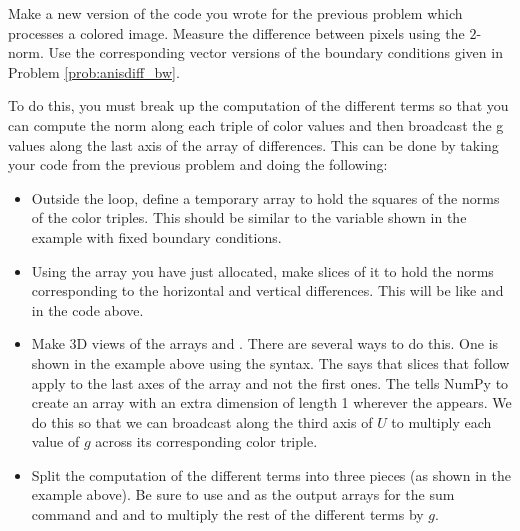 \begin{problem}
Make a new version of the code you wrote for the previous problem which processes a colored image.
Measure the difference between pixels using the $2$-norm.
Use the corresponding vector versions of the boundary conditions given in Problem \ref{prob:anisdiff_bw}.

To do this, you must break up the computation of the different terms so that you can compute the norm along each triple of color values and then broadcast the g values along the last axis of the array of differences.
This can be done by taking your code from the previous problem and doing the following:
\begin{itemize}

\item Outside the loop, define a temporary array to hold the squares of the norms of the color triples.
This should be similar to the variable  shown in the example with fixed boundary conditions.

\item Using the array you have just allocated, make slices of it to hold the norms corresponding to the horizontal and vertical differences.
This will be like  and  in the code above.

\item Make 3D views of the arrays  and .
There are several ways to do this.
One is shown in the example above using the \li{[...,None]} syntax.
The  says that slices that follow apply to the last axes of the array and not the first ones.
The  tells NumPy to create an array with an extra dimension of length 1 wherever the  appears.
We do this so that we can broadcast along the third axis of $U$ to multiply each value of $g$ across its corresponding color triple.

\item Split the computation of the different terms into three pieces (as shown in the example above).
Be sure to use  and  as the output arrays for the sum command and  and  to multiply the rest of the different terms by $g$.

\end{itemize}


\end{problem}
